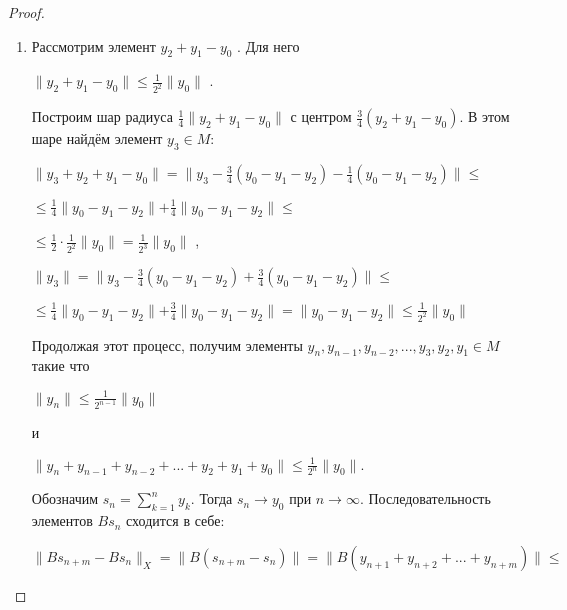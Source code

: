 \documentclass[12pt,a4paper,titlepage, oneside]{book}
\theoremstyle{definition}
\theoremstyle{plain}
\theoremstyle{remark}
\theoremstyle{remark}
\theoremstyle{remark}
\theoremstyle{remark}
\theoremstyle{plain}
\theoremstyle{plain}
\begin{document}
\begin{proof}
\begin{enumerate}
	\item Рассмотрим элемент $y_2+y_1- y_0$ . Для него 	\begin{center}	
	$\parallel y_2+y_1- y_0 \parallel \leq
	\frac{1}{2^2} \parallel y_0 \parallel$ .
	\end{center}
	Построим шар радиуса
	$\frac{1}{4} \parallel y_2 + y_1 - y_0 \parallel$      	с центром $\frac{3}{4}(y_2 + y_1 - y_0)$.
	В этом шаре найдём элемент 	$y_3 \in M$:
	\begin{center}
	$\parallel y_3 + y_2 + y_1 - y_0 \parallel =
	\parallel y_3 - \frac{3}{4}(y_0 - y_1 - y_2) -
	\frac{1}{4}(y_0 - y_1 - y_2) \parallel \leq $
	\end{center}
	\begin{center}
	$\leq \frac{1}{4} \parallel y_0 - y_1 - y_2 \parallel +
	\frac{1}{4} \parallel y_0 - y_1 - y_2 \parallel 			\leq $
	\end{center}
	\begin{center}
	$ \leq\frac{1}{2} \cdot
	\frac{1}{2^2} \parallel y_0 \parallel =
	\frac{1}{2^3} \parallel y_0 \parallel$ ,
	\end{center}
	\begin{center}
	$\parallel y_3 \parallel =
	\parallel y_3 - \frac{3}{4}(y_0 - y_1 - y_2) +
	\frac{3}{4}(y_0 - y_1 - y_2) \parallel \leq $
	\end{center}
	\begin{center}
	$\leq \frac{1}{4} \parallel y_0 - y_1 - y_2 				\parallel +
	\frac{3}{4} \parallel y_0 - y_1 - y_2 \parallel =
	 \parallel y_0 - y_1 - y_2 \parallel \leq
	 \frac{1}{2^2} \parallel y_0 \parallel$
	\end{center}

Продолжая этот процесс, получим элементы $y_n, y_{n-1}, y_{n-2}, ..., y_3, y_2, y_1 \in M$ такие что 

\begin{center}
$\lVert y_n \rVert \leq \frac{1}{2^{n-1}} \lVert y_0 \rVert$

и

$\lVert y_n + y_{n-1}+y_{n-2}+...+y_2+y_1+y_0 \rVert \leq \frac{1}{2^n} \lVert y_0 \rVert.$
\end{center}

Обозначим $s_n= \displaystyle\sum\limits_{k=1}^n y_k$. Тогда $s_n \to y_0$ при $n \to \infty$. Последовательность элементов $B s_n$ сходится в себе:

\begin{center}
$ \lVert B s_{n+m}-B s_n \rVert _X = \lVert B(s_{n+m}-s_n) \rVert= \lVert B(y_{n+1}+y_{n+2}+...+y_{n+m}) \rVert \leq $
\end{center}


\end{enumerate}
\end{proof}
\end{document}
